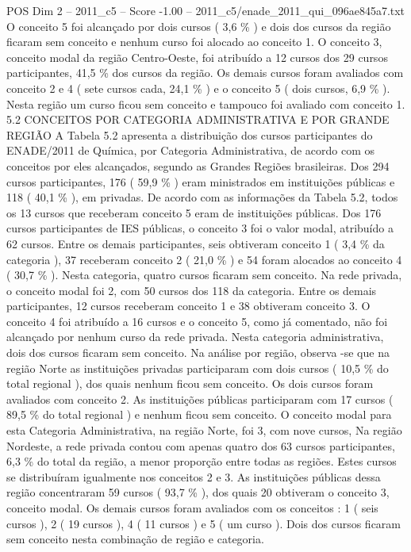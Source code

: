 \begin{textsample}{POS Dim 2 – 2011\_c5 – Score -1.00 – 2011\_c5/enade\_2011\_qui\_096ae845a7.txt}
O conceito 5 foi alcançado por dois cursos ( 3,6 \% ) e dois dos cursos da região ficaram sem conceito e nenhum curso foi alocado ao conceito 1.
O conceito 3, conceito modal da região Centro-Oeste, foi atribuído a 12 cursos dos 29 cursos participantes, 41,5 \% dos cursos da região.
Os demais cursos foram avaliados com conceito 2 e 4 ( sete cursos cada, 24,1 \% ) e o conceito 5 ( dois cursos, 6,9 \% ).
Nesta região um curso ficou sem conceito e tampouco foi avaliado com conceito 1. 5.2 CONCEITOS POR CATEGORIA ADMINISTRATIVA E POR GRANDE REGIÃO A Tabela 5.2 apresenta a distribuição dos cursos participantes do ENADE/2011 de Química, por Categoria Administrativa, de acordo com os conceitos por eles alcançados, segundo as Grandes Regiões brasileiras.
Dos 294 cursos participantes, 176 ( 59,9 \% ) eram ministrados em instituições públicas e 118 ( 40,1 \% ), em privadas.
De acordo com as informações da Tabela 5.2, todos os 13 cursos que receberam conceito 5 eram de instituições públicas.
Dos 176 cursos participantes de IES públicas, o conceito 3 foi o valor modal, atribuído a 62 cursos.
Entre os demais participantes, seis obtiveram conceito 1 ( 3,4 \% da categoria ), 37 receberam conceito 2 ( 21,0 \% ) e 54 foram alocados ao conceito 4 ( 30,7 \% ).
Nesta categoria, quatro cursos ficaram sem conceito.
Na rede privada, o conceito modal foi 2, com 50 cursos dos 118 da categoria.
Entre os demais participantes, 12 cursos receberam conceito 1 e 38 obtiveram conceito 3.
O conceito 4 foi atribuído a 16 cursos e o conceito 5, como já comentado, não foi alcançado por nenhum curso da rede privada.
Nesta categoria administrativa, dois dos cursos ficaram sem conceito.
Na análise por região, observa -se que na região Norte as instituições privadas participaram com dois cursos ( 10,5 \% do total regional ), dos quais nenhum ficou sem conceito.
Os dois cursos foram avaliados com conceito 2.
As instituições públicas participaram com 17 cursos ( 89,5 \% do total regional ) e nenhum ficou sem conceito.
O conceito modal para esta Categoria Administrativa, na região Norte, foi 3, com nove cursos, Na região Nordeste, a rede privada contou com apenas quatro dos 63 cursos participantes, 6,3 \% do total da região, a menor proporção entre todas as regiões.
Estes cursos se distribuíram igualmente nos conceitos 2 e 3.
As instituições públicas dessa região concentraram 59 cursos ( 93,7 \% ), dos quais 20 obtiveram o conceito 3, conceito modal.
Os demais cursos foram avaliados com os conceitos : 1 ( seis cursos ), 2 ( 19 cursos ), 4 ( 11 cursos ) e 5 ( um curso ).
Dois dos cursos ficaram sem conceito nesta combinação de região e categoria.

\end{textsample}

